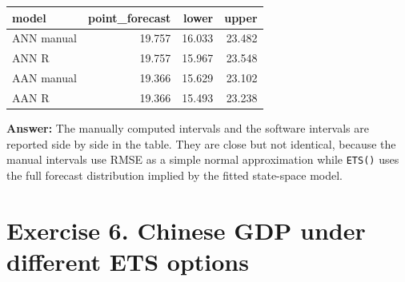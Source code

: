 \documentclass[
  11pt,
]{article}
\newcounter{none} %
\begin{document}
{\def\LTcaptype{none} %
\begin{longtable}[]{@{}lrrr@{}}
\toprule\noalign{}
model & point\_forecast & lower & upper \\
\midrule\noalign{}
\endhead
\bottomrule\noalign{}
\endlastfoot
ANN manual & 19.757 & 16.033 & 23.482 \\
ANN R & 19.757 & 15.967 & 23.548 \\
AAN manual & 19.366 & 15.629 & 23.102 \\
AAN R & 19.366 & 15.493 & 23.238 \\
\end{longtable}
}

\textbf{Answer:} The manually computed intervals and the software
intervals are reported side by side in the table. They are close but not
identical, because the manual intervals use RMSE as a simple normal
approximation while \texttt{ETS()} uses the full forecast distribution
implied by the fitted state-space model.

\section{Exercise 6. Chinese GDP under different ETS
options}\label{exercise-6.-chinese-gdp-under-different-ets-options}
\end{document}
